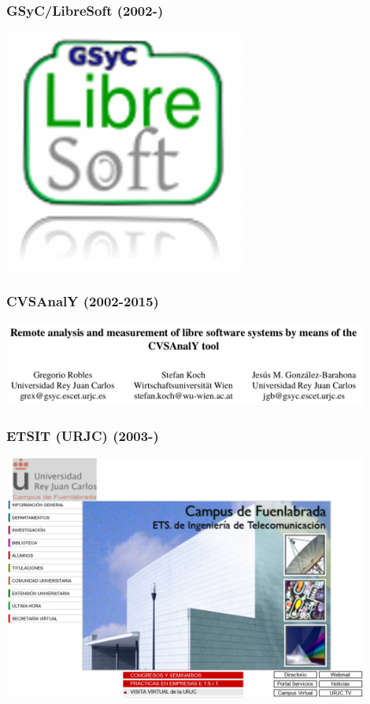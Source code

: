 \begin{frame}[fragile]
  \frametitle{GSyC/LibreSoft (2002-)}

  \begin{center}
  \includegraphics[height=8cm]{figs/libresoft}
  \end{center}  
  
\end{frame}

\begin{frame}[fragile]
  \frametitle{CVSAnalY (2002-2015)}

  \begin{center}
  \includegraphics[width=12cm]{figs/cvsanaly}
  \end{center}  
  
\end{frame}

\begin{frame}[fragile]
  \frametitle{ETSIT (URJC) (2003-)}

  \begin{center}
  \includegraphics[width=12cm]{figs/etsit-urjc}
  \end{center}  
  
\end{frame}



